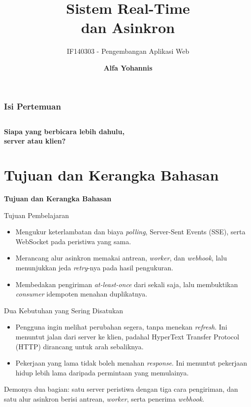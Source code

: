 \documentclass[aspectratio=169, table, 12pt]{beamer}
\title{\Huge Sistem Real-Time\\ \vspace{10pt} dan Asinkron}
\subtitle{IF140303 - Pengembangan Aplikasi Web}
\author{\textbf{Alfa Yohannis}}
\begin{document}
\frame{\titlepage}

\begin{frame}[fragile]
  \frametitle{Isi Pertemuan}
  \vspace{14pt}
  \begin{columns}[t]
    {\small\tableofcontents[sections={1-7}]}

    {\small\tableofcontents[sections={8-13}]}
  \end{columns}
\end{frame}

\begin{frame}{\hfill}
  \centering
  \Huge{\textbf{Siapa yang berbicara lebih dahulu,\\server atau klien?}}
\end{frame}

\section{Tujuan dan Kerangka Bahasan}

\begin{frame}{\hfill}
  \centering
  \Huge{\textbf{Tujuan dan Kerangka Bahasan}}
\end{frame}

\begin{frame}{{\Large Tujuan Pembelajaran}}
  \vspace{10pt}
  \begin{itemize}
    \item Mengukur keterlambatan dan biaya \textit{polling}, Server-Sent Events (SSE), serta
          WebSocket pada peristiwa yang sama.
    \item Merancang alur asinkron memakai antrean, \textit{worker}, dan
          \textit{webhook}, lalu menunjukkan jeda \textit{retry}-nya pada
          hasil pengukuran.
    \item Membedakan pengiriman \textit{at-least-once} dari sekali saja, lalu
          membuktikan \textit{consumer} idempoten menahan duplikatnya.
  \end{itemize}
\end{frame}

\begin{frame}{{\Large Dua Kebutuhan yang Sering Disatukan}}
  \vspace{12pt}
  \begin{itemize}
    \item Pengguna ingin melihat perubahan segera, tanpa menekan
          \textit{refresh}. Ini menuntut jalan dari server ke klien, padahal
          HyperText Transfer Protocol (HTTP) dirancang untuk arah sebaliknya.
    \item Pekerjaan yang lama tidak boleh menahan \textit{response}. Ini menuntut
          pekerjaan hidup lebih lama daripada permintaan yang memulainya.
  \end{itemize}
  \vspace{10pt}
  {\small Demonya dua bagian: satu server peristiwa dengan tiga cara
  pengiriman, dan satu alur asinkron berisi antrean, \textit{worker}, serta
  penerima \textit{webhook}.}
\end{frame}
\end{document}
